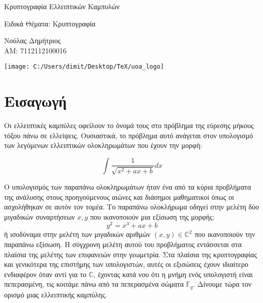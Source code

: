 \documentclass[oneside,a4paper]{article}
\begin{document}
	
	
	
	
	\begin{framed}	
		\begin{center}
			\huge Κρυπτογραφία Ελλειπτικών Καμπυλών
		\end{center}
		\begin{center}
            Ειδικά Θέματα: Κρυπτογραφία
		\end{center}
		\vspace{0.3truecm}
		\begin{center}
            Νούλας Δημήτριος\\
            ΑΜ: 7112112100016\\
\end{center}
		\vspace{0.3truecm}
	\end{framed}
	\vspace*{\fill}
	\begin{center}
	\texttt{[image: C:/Users/dimit/Desktop/TeX/uoa\_logo]}
	\end{center}
\vspace{1cm}
\pagebreak

\tableofcontents
\pagebreak

\section{Εισαγωγή}
Οι ελλειπτικές καμπύλες οφείλουν το όνομά τους στο πρόβλημα της εύρεσης μήκους τόξου πάνω σε ελλείψεις. Ουσιαστικά, το πρόβλημα αυτό ανάγεται στον υπολογισμό των λεγόμενων ελλειπτικών ολοκληρωμάτων που έχουν την μορφή:

$$\int \frac{1}{\sqrt{x^2 + ax + b}} dx$$

\noindent Ο υπολογισμός των παραπάνω ολοκληρωμάτων ήταν ένα από τα κύρια προβλήματα της ανάλυσης στους προηγούμενους αιώνες και διάσημοι μαθηματικοί όπως οι  ασχολήθηκαν σε αυτόν τον τομέα. Το παραπάνω ολοκλήρωμα οδηγεί στην μελέτη δύο μιγαδικών συναρτήσεων $x,y$ που ικανοποιούν μια εξίσωση της μορφής:
$$y^2 = x^3 + ax + b$$ ή ισοδύναμα στην μελέτη των μιγαδικών αριθμών $(x,y) \in \mathbb{C}^2$ που ικανοποιούν την παραπάνω εξίσωση. Η σύγχρονη μελέτη αυτού του προβλήματος εντάσσεται στα πλαίσια της μελέτης των επιφανειών  στην γεωμετρία. Στα πλαίσια της κρυπτογραφίας και γενικότερα της επιστήμης των υπολογιστών, αυτές οι εξισώσεις έχουν ιδιαίτερο ενδιαφέρον όταν αντί για το $\mathbb{C}$, έχοντας κατά νου ότι η μνήμη ενός υπολογιστή είναι πεπερασμένη, τις κοιτάμε πάνω από τα πεπερασμένα σώματα $\mathbb{F}_q$. Δίνουμε τώρα τον ορισμό μιας ελλειπτικής καμπύλης.
\end{document}
